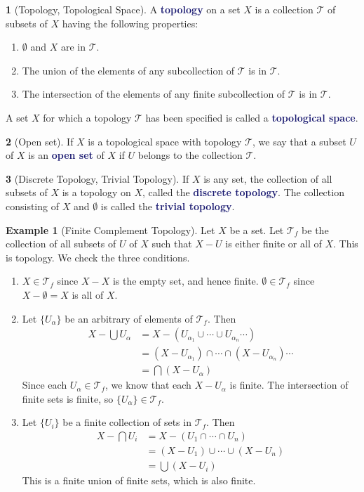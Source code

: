\documentclass[12pt]{article}
\newcommand{\navy}[1]{\textcolor{MidnightBlue}{\bf #1}}
\theoremstyle{plain}
\theoremstyle{definition}
\newtheorem{definition}{\color{MidnightBlue}{\textbf{Definition}}}[section]
\newtheorem{example}{\color{WildStrawberry}Example}[section]
\newcommand{\1}{\mathbbm 1}
\newcommand{\tT}{\mathcal T}
\begin{document}
\begin{definition}[Topology, Topological Space]
	A \navy{topology} on a set $X$ is a collection $\tT$ of subsets of $X$ having the following properties:
	\begin{enumerate}
		\item $\emptyset$ and $X$ are in $\tT$.
		\item The union of the elements of any subcollection of $\tT$ is in $\tT$.
		\item The intersection of the elements of any finite subcollection of $\tT$ is in $\tT$.
	\end{enumerate}
	A set $X$ for which a topology $\tT$ has been specified is called a \navy{topological space}.
\end{definition}

\begin{definition}[Open set]
	If $X$ is a topological space with topology $\tT$, we say that a subset $U$ of $X$ is an \navy{open set} of $X$ if $U$ belongs to the collection $\tT$.
\end{definition}

\begin{definition}[Discrete Topology, Trivial Topology]
	If $X$ is any set, the collection of all subsets of $X$ is a topology on $X$, called the \navy{discrete topology}. The collection consisting of $X$ and $\emptyset$ is called the \navy{trivial topology}.
\end{definition}

\begin{example}[Finite Complement Topology]
	Let $X$ be a set. Let $\tT_f$ be the collection of all subsets of $U$ of $X$ such that $X-U$ is either finite or all of $X$. This is topology. We check the three conditions.
	\begin{enumerate}
		\item $X \in \tT_f$ since $X - X$ is the empty set, and hence finite. $\emptyset \in \tT_f$ since $X - \emptyset = X$ is all of $X$.
		\item Let $\{U_\alpha\}$ be an arbitrary of elements of $\tT_f$. Then
		\begin{align*}
			X - \bigcup U_\alpha &= X - \left(U_{\alpha_1} \cup \cdots \cup U_{\alpha_n}  \cdots \right) \\
			&= (X - U_{\alpha_1}) \cap \cdots \cap (X - U_{\alpha_n}) \cdots \\
			&= \bigcap (X - U_\alpha)
		\end{align*}
		Since each $U_\alpha \in \tT_f$, we know that each $X - U_\alpha$ is finite. The intersection of finite sets is finite, so $\{U_\alpha\} \in \tT_f$. 
		\item Let $\{U_i\}$ be a finite collection of sets in $\tT_f$. Then
		\begin{align*}
			X - \bigcap U_i &= X - \left(U_1 \cap \cdots \cap U_n \right) \\
			&= (X - U_1) \cup \cdots \cup (X - U_n) \\
			&= \bigcup (X - U_i)
		\end{align*}
		This is a finite union of finite sets, which is also finite. 
	\end{enumerate}
\end{example}
\end{document}
